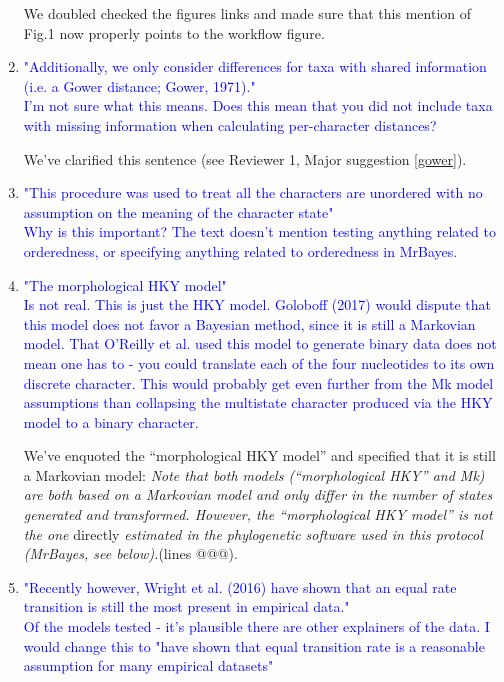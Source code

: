 \documentclass[12pt,letterpaper]{article}
\begin{document}
\begin{enumerate}
We doubled checked the figures links and made sure that this mention of Fig.1 now properly points to the workflow figure.

\item{\textcolor{blue}{"Additionally, we only consider differences for taxa with shared information (i.e. a Gower distance; Gower, 1971)."\\
I'm not sure what this means. Does this mean that you did not include taxa with missing information when calculating per-character distances?}}

We've clarified this sentence (see Reviewer 1, Major suggestion \ref{gower}).


\item{\textcolor{blue}{"This procedure was used to treat all the characters are unordered with no assumption on the meaning of the character state"\\
Why is this important? The text doesn't mention testing anything related to orderedness, or specifying anything related to orderedness in MrBayes.}}


\item{\textcolor{blue}{"The morphological HKY model"\\
Is not real. This is just the HKY model. Goloboff (2017) would dispute that this model does not favor a Bayesian method, since it is still a Markovian model. That O'Reilly et al. used this model to generate binary data does not mean one has to - you could translate each of the four nucleotides to its own discrete character. This would probably get even further from the Mk model assumptions than collapsing the multistate character produced via the HKY model to a binary character.}}

We've enquoted the ``morphological HKY model'' and specified that it is still a Markovian model:
\textit{Note that both models (``morphological HKY'' and Mk) are both based on a Markovian model and only differ in the number of states generated and transformed.
However, the ``morphological HKY model'' is not the one} directly \textit{estimated in the phylogenetic software used in this protocol (MrBayes, see below).}(lines @@@).


\item{\textcolor{blue}{"Recently however, Wright et al. (2016) have shown that an equal rate transition is still the most present in empirical data."\\
Of the models tested - it's plausible there are other explainers of the data. I would change this to "have shown that equal transition rate is a reasonable assumption for many empirical datasets"}}


\end{enumerate}
\end{document}
